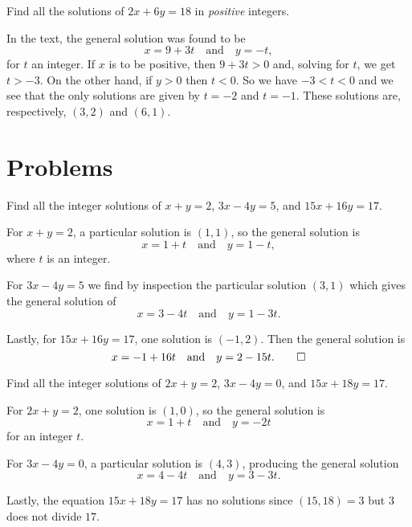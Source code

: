  Find all the solutions of $2x + 6y = 18$ in {\em positive}
integers.
\begin{solution}
  In the text, the general solution was found to be
  \begin{equation*}
    x = 9 + 3t \quad\text{and}\quad y = -t,
  \end{equation*}
  for $t$ an integer. If $x$ is to be positive, then $9 + 3t > 0$ and,
  solving for $t$, we get $t > -3$. On the other hand, if $y > 0$ then
  $t < 0$. So we have $-3 < t < 0$ and we see that the only solutions
  are given by $t = -2$ and $t = -1$. These solutions are,
  respectively, $(3,2)$ and $(6,1)$.
\end{solution}

\section{Problems}

 Find all the integer solutions of $x + y = 2$,
$3x - 4y = 5$, and $15x + 16y = 17$.
\label{problem:lin-dioph-eq:first-set}
\begin{solution}
  For $x + y = 2$, a particular solution is $(1,1)$, so the general
  solution is
  \begin{equation*}
    x = 1 + t \quad\text{and}\quad y = 1 - t,
  \end{equation*}
  where $t$ is an integer.

  For $3x - 4y = 5$ we find by inspection the particular solution
  $(3,1)$ which gives the general solution of
  \begin{equation*}
    x = 3 - 4t \quad\text{and}\quad y = 1 - 3t.
  \end{equation*}

  Lastly, for $15x + 16y = 17$, one solution is $(-1,2)$. Then the
  general solution is
  \begin{equation*}
    x = -1 + 16t
    \quad\text{and}\quad
    y = 2 - 15t. \qedhere
  \end{equation*}
\end{solution}

 Find all the integer solutions of $2x + y = 2$,
$3x - 4y = 0$, and $15x + 18y = 17$.
\label{problem:lin-dioph-eq:second-set}
\begin{solution}
  For $2x + y = 2$, one solution is $(1,0)$, so the general solution
  is
  \begin{equation*}
    x = 1 + t \quad\text{and}\quad y = -2t
  \end{equation*}
  for an integer $t$.

  For $3x - 4y = 0$, a particular solution is $(4,3)$, producing the
  general solution
  \begin{equation*}
    x = 4 - 4t \quad\text{and}\quad y = 3 - 3t.
  \end{equation*}

  Lastly, the equation $15x + 18y = 17$ has no solutions since
  $(15,18) = 3$ but $3$ does not divide $17$.
\end{solution}

